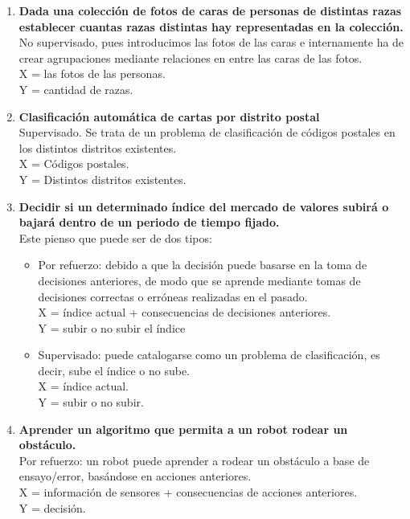 \begin{enumerate}
	\item \textbf{Dada una colección de fotos de caras de personas de distintas razas establecer cuantas razas distintas hay representadas en la colección.}\\
	No supervisado, pues introducimos las fotos de las caras e internamente ha de crear agrupaciones mediante relaciones en entre las caras de las fotos.\\
	X = las fotos de las personas.\\
	Y = cantidad de razas.	\\
	
	\item\textbf{Clasificación automática de cartas por distrito postal}\\
	Supervisado. Se trata de un problema de clasificación de códigos postales en los distintos distritos existentes.\\
	X = Códigos postales.\\
	Y = Distintos distritos existentes.\\
	
	
	\item \textbf{Decidir si un determinado índice del mercado de valores subirá o bajará dentro de un periodo de tiempo fijado.}\\
	Este pienso que puede ser de dos tipos:
	\begin{itemize}
		\item Por refuerzo: debido a que la decisión puede basarse en la toma de decisiones anteriores, de modo que se aprende mediante tomas de decisiones correctas o erróneas realizadas en el pasado.\\
		X = índice actual + consecuencias de decisiones anteriores.\\
		Y = subir o no subir el índice\\

		\item Supervisado: puede catalogarse como un problema de clasificación, es decir, sube el índice o no sube.\\
		X = índice actual.\\
		Y = subir o no subir.\\
	\end{itemize}
	
	
	\item \textbf{Aprender un algoritmo que permita a un robot rodear un obstáculo.}
	\\ Por refuerzo: un robot puede aprender a rodear un obstáculo a base de ensayo/error, basándose en acciones anteriores.\\ 
	X = información de sensores + consecuencias de acciones anteriores.\\
	Y = decisión.

\end{enumerate}





